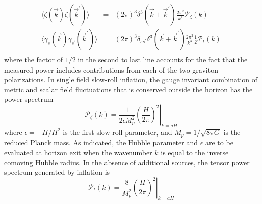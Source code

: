 \begin{eqnarray}
\langle\zeta(\vec{k})\zeta(\vec{k}^{\prime})\rangle&=&(2\pi)^3\delta^3(\vec{k}+\vec{k}^{\prime})\frac{2\pi^2}{k^3}\mathcal{P}_{\zeta}(k)\nonumber\\
\langle\gamma_s(\vec{k})\gamma_{s^{\prime}}(\vec{k}^{\prime})\rangle&=&(2\pi)^3\delta_{ss^{\prime}}\delta^3(\vec{k}+\vec{k}^{\prime})\frac{2\pi^2}{k^3}\frac{1}{2}\mathcal{P}_{t}(k)\nonumber\\
\end{eqnarray}
where the factor of $1/2$ in the second to last line accounts for the fact that the measured power includes contributions from each of the two graviton polarizations. In single field slow-roll inflation, the gauge invariant combination of metric and scalar field fluctuations that is conserved outside the horizon has the power spectrum
\begin{equation}
\label{eq:inf_Pzeta}
\mathcal{P}_{\zeta}(k)=\frac{1}{2\epsilon M_p^2}\left.\left(\frac{H}{2\pi}\right)^2\right|_{k=aH}
\end{equation}
where $\epsilon=-\dot{H}/H^2$ is the first slow-roll parameter, and $M_p=1/\sqrt{8\pi G}$ is the reduced Planck mass. As indicated, the Hubble parameter and $\epsilon$ are to be evaluated at horizon exit when the wavenumber $k$ is equal to the inverse comoving Hubble radius. In the absence of additional sources, the tensor power spectrum generated by inflation is
\begin{equation}
\label{eq:inf_Pt}
\mathcal{P}_{t}(k)=\frac{8}{M_p^2}\left.\left(\frac{H}{2\pi}\right)^2\right|_{k=aH}
\end{equation}


